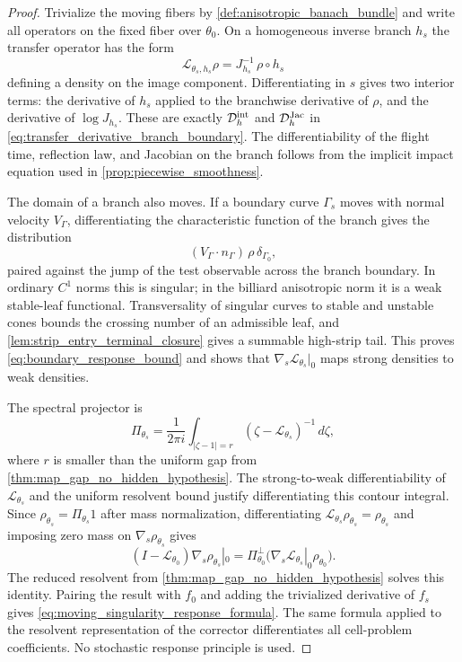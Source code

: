 \documentclass[12pt, letterpaper]{amsart}
\providecommand{\Ltransfer}{\mathscr{L}}
\providecommand{\Piperp}{\Pi^\perp}
\theoremstyle{plain}
\theoremstyle{definition}
\theoremstyle{remark}
\begin{document}
\begin{proof}
Trivialize the moving fibers by \cref{def:anisotropic_banach_bundle} and write
all operators on the fixed fiber over $\theta_0$.  On a homogeneous inverse
branch $h_s$ the transfer operator has the form
\begin{equation}
    \Ltransfer_{\theta_s,h_s}\rho
     = J_{h_s}^{-1}\,\rho\circ h_s
\end{equation}
defining a density on the image component.  Differentiating in $s$ gives two
interior terms: the derivative of $h_s$ applied to the branchwise derivative of
$\rho$, and the derivative of $\log J_{h_s}$.  These are exactly
$\mathcal D_h^{\rm int}$ and $\mathcal D_h^{\rm Jac}$ in
\eqref{eq:transfer_derivative_branch_boundary}.  The differentiability of the
flight time, reflection law, and Jacobian on the branch follows from the
implicit impact equation used in \cref{prop:piecewise_smoothness}.

The domain of a branch also moves.  If a boundary curve $\Gamma_s$ moves with
normal velocity $V_\Gamma$, differentiating the characteristic function of the
branch gives the distribution
\begin{equation}
    (V_\Gamma\cdot n_\Gamma)\,\rho\,\delta_{\Gamma_0},
\end{equation}
paired against the jump of the test observable across the branch boundary.  In
ordinary $C^1$ norms this is singular; in the billiard anisotropic norm it is a
weak stable-leaf functional.  Transversality of singular curves to stable and
unstable cones bounds the crossing number of an admissible leaf, and
\cref{lem:strip_entry_terminal_closure} gives a summable high-strip tail.  This
proves \eqref{eq:boundary_response_bound} and shows that
$\nabla_s\Ltransfer_{\theta_s}|_{0}$ maps strong densities to weak densities.

The spectral projector is
\begin{equation}
    \Pi_{\theta_s}=\frac1{2\pi i}\int_{|\zeta-1|=r}
       (\zeta-\Ltransfer_{\theta_s})^{-1}\,d\zeta,
\end{equation}
where $r$ is smaller than the uniform gap from
\cref{thm:map_gap_no_hidden_hypothesis}.  The strong-to-weak differentiability
of $\Ltransfer_{\theta_s}$ and the uniform resolvent bound justify
differentiating this contour integral.  Since
$\rho_{\theta_s}=\Pi_{\theta_s}1$ after mass normalization, differentiating
$\Ltransfer_{\theta_s}\rho_{\theta_s}=\rho_{\theta_s}$ and imposing zero mass on
$\nabla_s\rho_{\theta_s}$ gives
\begin{equation}
    (I-\Ltransfer_{\theta_0})\nabla_s\rho_{\theta_s}|_0
    =\Piperp_{\theta_0}
      \big(\nabla_s\Ltransfer_{\theta_s}|_0\rho_{\theta_0}\big).
\end{equation}
The reduced resolvent from \cref{thm:map_gap_no_hidden_hypothesis} solves this
identity.  Pairing the result with $f_0$ and adding the trivialized derivative
of $f_s$ gives \eqref{eq:moving_singularity_response_formula}.  The same formula
applied to the resolvent representation of the corrector differentiates all
cell-problem coefficients.  No stochastic response principle is used.
\end{proof}
\end{document}
